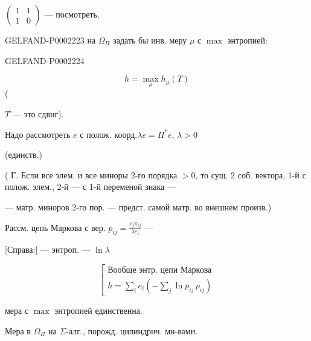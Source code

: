 $\begin{pmatrix}1&1\\1&0\end{pmatrix}$ — посмотреть.



\begin{GelfandAdjacentEvidence}{GELFAND-P000222}{3}
на $\Omega_\Pi$ задать бы инв. меру $\mu$ с $\max$ энтропией:



\end{GelfandAdjacentEvidence}
\begin{GelfandAdjacentEvidence}{GELFAND-P000222}{4}

\begin{equation*}
 h=\max_\mu h_\mu(T)
\end{equation*}
(
\end{GelfandAdjacentEvidence}
 $T$ — это сдвиг).

Надо рассмотреть $e$ с полож. коорд.\quad $\lambda e=\Pi^*e$, $\lambda>0$

(единств.)



( Г. Если все элем. и все миноры 2-го порядка $>0$, то
сущ. 2 соб. вектора, 1-й с полож. элем., 2-й — с
1-й переменой знака —

— матр. миноров 2-го пор. — предст. самой матр. во внешнем произв.)



Рассм. цепь Маркова с вер. $\displaystyle p_{ij}=\frac{e_j\pi_{ij}}{\lambda e_i}$ —

[Справа:] — энтроп. — $\ln\lambda$



\begin{equation*}
\left[
\begin{gathered}
\text{Вообще энтр. цепи Маркова}\\
 h=\sum_i e_i\left(-\sum_j\ln p_{ij}\,p_{ij}\right)
\end{gathered}
\right.
\end{equation*}



мера с $\max$ энтропией единственна.



Мера в $\Omega_\Pi$ на $\Sigma$-алг., порожд. цилиндрич. мн-вами.





